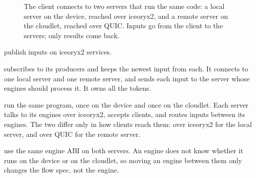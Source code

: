 \documentclass[11pt]{article}
\begin{document}
\begin{figure}[h]
\centering
{}
\caption{The client connects to two servers that run the same code: a local
server on the device, reached over iceoryx2, and a remote server on the
cloudlet, reached over QUIC. Inputs go from the client to the servers; only
results come back.}
\label{fig:arch}
\end{figure}

\begin{description}[nosep]
  \item[Producers] publish inputs on iceoryx2 services.
  \item[The client] subscribes to its producers and keeps the newest input
        from each. It connects to one local server and one remote server, and
        sends each input to the server whose engines should process it. It
        owns all the tokens.
  \item[The local and remote servers] run the same program, once on the
        device and once on the cloudlet. Each server talks to its engines over
        iceoryx2, accepts clients, and routes inputs between its engines. The
        two differ only in how clients reach them: over iceoryx2 for the local
        server, and over QUIC for the remote server.
  \item[Engines] use the same engine ABI on both servers. An engine does not
        know whether it runs on the device or on the cloudlet, so moving an
        engine between them only changes the flow spec, not the engine.
\end{description}
\end{document}
